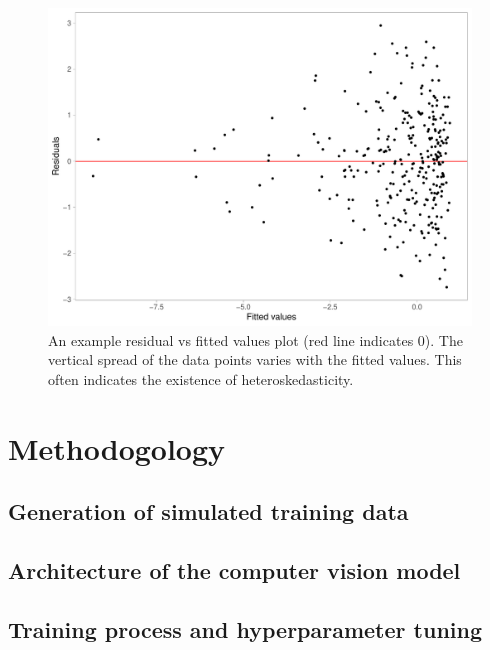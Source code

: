 \documentclass[]{interact}
\theoremstyle{plain}%
\theoremstyle{definition}
\theoremstyle{remark}
\begin{document}
\begin{figure}

{\centering \includegraphics[width=1\linewidth]{paper_files/figure-latex/false-finding-1} 

}

\caption{An example residual vs fitted values plot (red line indicates 0). The vertical spread of the data points varies with the fitted values. This often indicates the existence of heteroskedasticity.}\label{fig:false-finding}
\end{figure}

\hypertarget{methodogology}{%
\section{Methodogology}\label{methodogology}}

\hypertarget{generation-of-simulated-training-data}{%
\subsection{Generation of simulated training
data}\label{generation-of-simulated-training-data}}

\hypertarget{architecture-of-the-computer-vision-model}{%
\subsection{Architecture of the computer vision
model}\label{architecture-of-the-computer-vision-model}}

\hypertarget{training-process-and-hyperparameter-tuning}{%
\subsection{Training process and hyperparameter
tuning}\label{training-process-and-hyperparameter-tuning}}
\end{document}
